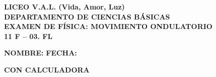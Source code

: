 \documentclass[11pt, letterpaper]{article}
\begin{document}
 
	
	\begin{center} 
		{\Large \textbf{\color{valblue} LICEO V.A.L. (Vida, Amor, Luz)}}\\[0.1cm] 
		{\large \textbf{DEPARTAMENTO DE CIENCIAS BÁSICAS}}\\[0.1cm] 
		{\large \textbf{EXAMEN DE FÍSICA: MOVIMIENTO ONDULATORIO}}\\[0.1cm] 
		\hfill \textbf{11 F -- 03. FL} 
	\end{center} 
	\vspace{0.2cm} 
	
	\noindent \textbf{NOMBRE:} \underline{\hspace{8.5cm}} \hfill \textbf{FECHA:} \underline{\hspace{3cm}} 
	\vspace{0.2cm} 
	
	\hfill\noindent \textbf{CON CALCULADORA} 
	\vspace{0.4cm} 
	
\end{document}
